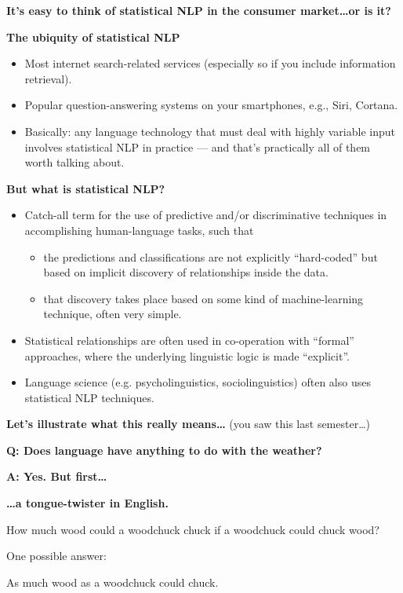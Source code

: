 \documentclass{beamer}
\newcommand{\placard}[1]{
  \begin{frame}
    \begin{center}
      \huge
      \textbf{#1}
    \end{center}
  \end{frame}
}
\newcommand{\pagestepalt}[2]{
  \begin{frame}[t]
    \begin{minipage}[t][0.26\textheight][t]{\textwidth}
      \begin{center}
        \huge
        \textbf{#1}
      \end{center}
    \end{minipage}
    
    \begin{minipage}[t][0.7\textheight][c]{\textwidth}
      #2
    \end{minipage}
  \end{frame}
}
\begin{document}
\placard{It's easy to think of statistical NLP in the consumer market\ldots or is it?}

\pagestepalt{The ubiquity of statistical NLP}{
  \begin{itemize}
  \item Most internet search-related services (especially so if you include information retrieval).\pause
  \item Popular question-answering systems on your smartphones, e.g., Siri, Cortana.\pause
  \item Basically: any language technology that must deal with highly variable input involves statistical NLP
    in practice --- and that's practically all of them worth talking about.
  \end{itemize}
}

\pagestepalt{But what is statistical NLP?}{
  \begin{itemize}
  \item Catch-all term for the use of \alert{predictive} and/or \alert{discriminative} techniques in accomplishing
    human-language tasks, such that\pause
    \begin{itemize}
    \item the predictions and classifications are not explicitly
      ``hard-coded'' but based on implicit discovery of relationships
      inside the data.\pause
    \item that discovery takes place based on some kind of
      machine-learning technique, often very simple.\pause
    \end{itemize}
  \item Statistical relationships are often used in co-operation with
    ``formal'' approaches, where the underlying linguistic logic is
    made ``explicit''.\pause
  \item Language \alert{science} (e.g. psycholinguistics,
    sociolinguistics) often also uses statistical NLP techniques.
  \end{itemize}\pause
  \begin{center}
    \textbf{Let's illustrate what this really means\ldots} (you saw this last semester\ldots)
  \end{center}
}

\placard{Q: Does language have anything to do with the weather?}

\placard{A: Yes. But first\ldots}

\pagestepalt{\ldots a tongue-twister in English.}{
  \begin{center}
    \Large How much wood could a woodchuck chuck if a woodchuck could
    chuck wood?
  \end{center}\pause
  One possible answer:
  \begin{center}
    \Large As much wood as a woodchuck could chuck. 
  \end{center}
}
\end{document}

